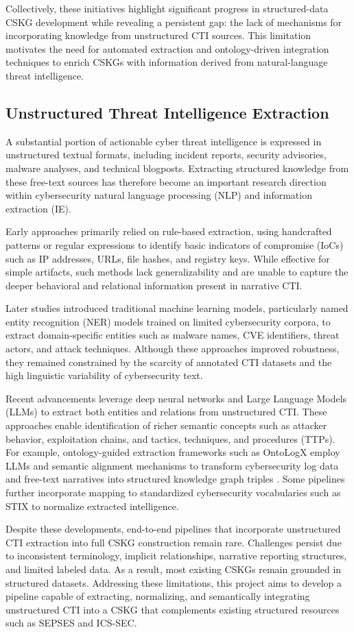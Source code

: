 Collectively, these initiatives highlight significant progress in structured-data CSKG development while revealing a persistent gap: the lack of mechanisms for incorporating knowledge from unstructured CTI sources. This limitation motivates the need for automated extraction and ontology-driven integration techniques to enrich CSKGs with information derived from natural-language threat intelligence.

\subsection{Unstructured Threat Intelligence Extraction}

A substantial portion of actionable cyber threat intelligence is expressed in unstructured textual formats, including incident reports, security advisories, malware analyses, and technical blogposts. Extracting structured knowledge from these free-text sources has therefore become an important research direction within cybersecurity natural language processing (NLP) and information extraction (IE).

Early approaches primarily relied on rule-based extraction, using handcrafted patterns or regular expressions to identify basic indicators of compromise (IoCs) such as IP addresses, URLs, file hashes, and registry keys. While effective for simple artifacts, such methods lack generalizability and are unable to capture the deeper behavioral and relational information present in narrative CTI.

Later studies introduced traditional machine learning models, particularly named entity recognition (NER) models trained on limited cybersecurity corpora, to extract domain-specific entities such as malware names, CVE identifiers, threat actors, and attack techniques. Although these approaches improved robustness, they remained constrained by the scarcity of annotated CTI datasets and the high linguistic variability of cybersecurity text.

Recent advancements leverage deep neural networks and Large Language Models (LLMs) to extract both entities and relations from unstructured CTI. These approaches enable identification of richer semantic concepts such as attacker behavior, exploitation chains, and tactics, techniques, and procedures (TTPs). For example, ontology-guided extraction frameworks such as OntoLogX employ LLMs and semantic alignment mechanisms to transform cybersecurity log data and free-text narratives into structured knowledge graph triples \cite{Cotti2025OntoLogX}. Some pipelines further incorporate mapping to standardized cybersecurity vocabularies such as STIX to normalize extracted intelligence.

Despite these developments, end-to-end pipelines that incorporate unstructured CTI extraction into full CSKG construction remain rare. Challenges persist due to inconsistent terminology, implicit relationships, narrative reporting structures, and limited labeled data. As a result, most existing CSKGs remain grounded in structured datasets. Addressing these limitations, this project aims to develop a pipeline capable of extracting, normalizing, and semantically integrating unstructured CTI into a CSKG that complements existing structured resources such as SEPSES and ICS-SEC.
